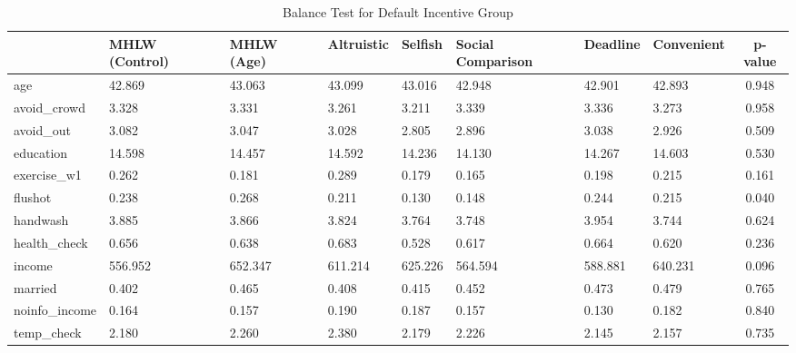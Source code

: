 \begin{table}[!h]

\caption{Balance Test for Default Incentive Group \label{tab:act2-coupon1-balance}}
\centering
\fontsize{9}{11}\selectfont
\begin{threeparttable}
\begin{tabular}[t]{l>{\centering\arraybackslash}p{3em}>{\centering\arraybackslash}p{3em}>{\centering\arraybackslash}p{3em}>{\centering\arraybackslash}p{3em}>{\centering\arraybackslash}p{3em}>{\centering\arraybackslash}p{3em}>{\centering\arraybackslash}p{3em}c}
\toprule
  & MHLW (Control) & MHLW (Age) & Altruistic & Selfish & Social Comparison & Deadline & Convenient & p-value\\
\midrule
age & \num{42.869} & \num{43.063} & \num{43.099} & \num{43.016} & \num{42.948} & \num{42.901} & \num{42.893} & \num{0.948}\\
avoid\_crowd & \num{3.328} & \num{3.331} & \num{3.261} & \num{3.211} & \num{3.339} & \num{3.336} & \num{3.273} & \num{0.958}\\
avoid\_out & \num{3.082} & \num{3.047} & \num{3.028} & \num{2.805} & \num{2.896} & \num{3.038} & \num{2.926} & \num{0.509}\\
education & \num{14.598} & \num{14.457} & \num{14.592} & \num{14.236} & \num{14.130} & \num{14.267} & \num{14.603} & \num{0.530}\\
exercise\_w1 & \num{0.262} & \num{0.181} & \num{0.289} & \num{0.179} & \num{0.165} & \num{0.198} & \num{0.215} & \num{0.161}\\
flushot & \num{0.238} & \num{0.268} & \num{0.211} & \num{0.130} & \num{0.148} & \num{0.244} & \num{0.215} & \num{0.040}\\
handwash & \num{3.885} & \num{3.866} & \num{3.824} & \num{3.764} & \num{3.748} & \num{3.954} & \num{3.744} & \num{0.624}\\
health\_check & \num{0.656} & \num{0.638} & \num{0.683} & \num{0.528} & \num{0.617} & \num{0.664} & \num{0.620} & \num{0.236}\\
income & \num{556.952} & \num{652.347} & \num{611.214} & \num{625.226} & \num{564.594} & \num{588.881} & \num{640.231} & \num{0.096}\\
married & \num{0.402} & \num{0.465} & \num{0.408} & \num{0.415} & \num{0.452} & \num{0.473} & \num{0.479} & \num{0.765}\\
noinfo\_income & \num{0.164} & \num{0.157} & \num{0.190} & \num{0.187} & \num{0.157} & \num{0.130} & \num{0.182} & \num{0.840}\\
temp\_check & \num{2.180} & \num{2.260} & \num{2.380} & \num{2.179} & \num{2.226} & \num{2.145} & \num{2.157} & \num{0.735}\\

\end{tabular}
\end{threeparttable}
\end{table}
